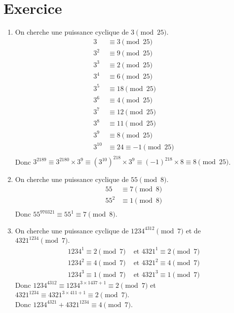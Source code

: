 \documentclass{report}
\begin{document}
\section{Exercice}
\begin{enumerate}
    \item On cherche une puissance cyclique de $3 \pmod{25}$. \\
    \begin{align*}
        3 &\equiv 3 \pmod{25} \\
        3^2 &\equiv 9 \pmod{25} \\
        3^3 &\equiv 2 \pmod{25} \\
        3^4 &\equiv 6 \pmod{25} \\
        3^5 &\equiv 18 \pmod{25} \\
        3^6 &\equiv 4 \pmod{25} \\
        3^7 &\equiv 12 \pmod{25} \\
        3^8 &\equiv 11 \pmod{25} \\
        3^9 &\equiv 8 \pmod{25} \\
        3^{10} &\equiv 24 \equiv -1 \pmod{25} \\
    \end{align*}
    Donc $\boxed{3^{2189} \equiv 3^{2180} \times 3^{9} \equiv (3^{10})^{218} \times 3^9 \equiv (-1)^{218} \times 8 \equiv 8 \pmod{25}}$.

    \item On cherche une puissance cyclique de $55 \pmod{8}$. \\
    \begin{align*}
        55 &\equiv 7 \pmod{8} \\
        55^2 &\equiv 1 \pmod{8} \\
    \end{align*}
    Donc $\boxed{55^{970321} \equiv 55^1 \equiv 7 \pmod{8}}$.

    \item On cherche une puissance cyclique de $1234^{4312} \pmod{7}$ et de $4321^{1234} \pmod{7}$. \\
    \begin{align*}
        1234^1 \equiv 2 \pmod{7} &\text{ et } 4321^1 \equiv 2 \pmod{7} \\
        1234^2 \equiv 4 \pmod{7} &\text{ et } 4321^2 \equiv 4 \pmod{7} \\
        1234^3 \equiv 1 \pmod{7} &\text{ et } 4321^3 \equiv 1 \pmod{7}
    \end{align*}
    Donc $1234^{4312} \equiv 1234^{3 \times 1437 + 1} \equiv 2 \pmod{7}$ et $4321^{1234} \equiv 4321^{3 \times 411 + 1} \equiv 2 \pmod{7}$. \\
    Donc $\boxed{1234^{4321} + 4321^{1234} \equiv 4 \pmod{7}}$.
\end{enumerate}
\end{document}
